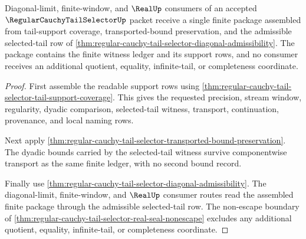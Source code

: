 \begin{theorem}
\label{thm:regular-cauchy-tail-selector-diagonal-consumer-package}
Diagonal-limit, finite-window, and $\RealUp$ consumers of an accepted $\RegularCauchyTailSelectorUp$ packet receive a single finite package assembled from tail-support coverage, transported-bound preservation, and the admissible selected-tail row of \autoref{thm:regular-cauchy-tail-selector-diagonal-admissibility}. The package contains the finite witness ledger and its support rows, and no consumer receives an additional quotient, equality, infinite-tail, or completeness coordinate.
\end{theorem}
\begin{proof}
First assemble the readable support rows using \autoref{thm:regular-cauchy-tail-selector-tail-support-coverage}. This gives the requested precision, stream window, regularity, dyadic comparison, selected-tail witness, transport, continuation, provenance, and local naming rows.

Next apply \autoref{thm:regular-cauchy-tail-selector-transported-bound-preservation}. The dyadic bounds carried by the selected-tail witness survive componentwise transport as the same finite ledger, with no second bound record.

Finally use \autoref{thm:regular-cauchy-tail-selector-diagonal-admissibility}. The diagonal-limit, finite-window, and $\RealUp$ consumer routes read the assembled finite package through the admissible selected-tail row. The non-escape boundary of \autoref{thm:regular-cauchy-tail-selector-real-seal-nonescape} excludes any additional quotient, equality, infinite-tail, or completeness coordinate.
\end{proof}

